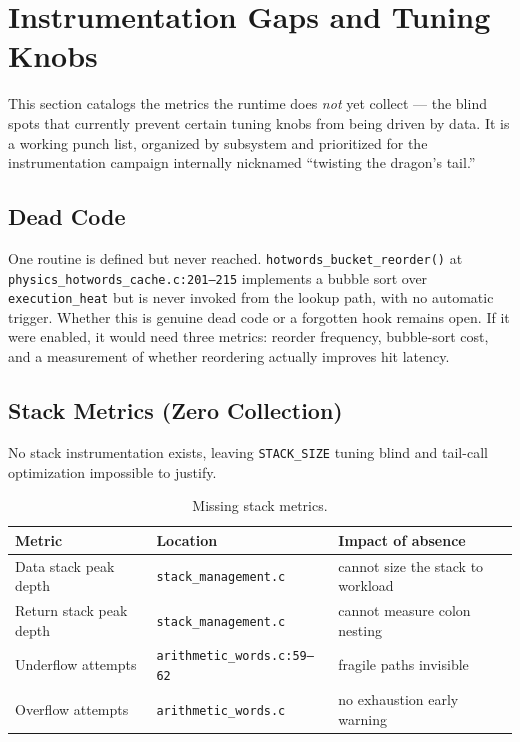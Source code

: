 
\section{Instrumentation Gaps and Tuning Knobs}

This section catalogs the metrics the runtime does \emph{not} yet collect ---
the blind spots that currently prevent certain tuning knobs from being driven by
data. It is a working punch list, organized by subsystem and prioritized for
the instrumentation campaign internally nicknamed ``twisting the dragon's tail.''

\subsection{Dead Code}

One routine is defined but never reached.
\texttt{hotwords\_bucket\_reorder()} at
\texttt{physics\_hotwords\_cache.c:201--215} implements a bubble sort over
\texttt{execution\_heat} but is never invoked from the lookup path, with no
automatic trigger. Whether this is genuine dead code or a forgotten hook
remains open. If it were enabled, it would need three metrics: reorder
frequency, bubble-sort cost, and a measurement of whether reordering actually
improves hit latency.

\subsection{Stack Metrics (Zero Collection)}

No stack instrumentation exists, leaving \texttt{STACK\_SIZE} tuning blind and
tail-call optimization impossible to justify.

\begin{table}[ht]
\centering
\small
\begin{tabular}{lll}
\toprule
Metric & Location & Impact of absence \\
\midrule
Data stack peak depth & \texttt{stack\_management.c} & cannot size the stack to workload \\
Return stack peak depth & \texttt{stack\_management.c} & cannot measure colon nesting \\
Underflow attempts & \texttt{arithmetic\_words.c:59--62} & fragile paths invisible \\
Overflow attempts & \texttt{arithmetic\_words.c} & no exhaustion early warning \\
\bottomrule
\end{tabular}
\caption{Missing stack metrics.}
\end{table}

